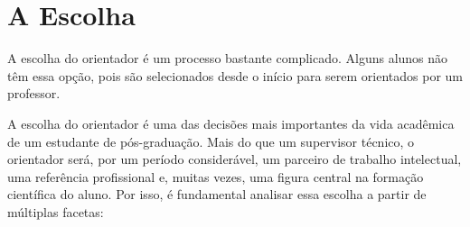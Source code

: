 \section{A Escolha}


A escolha do orientador é um processo bastante complicado. Alguns alunos não têm essa opção, pois são selecionados desde o início para serem orientados por um professor. 



A escolha do orientador é uma das decisões mais importantes da vida acadêmica de um estudante de pós-graduação. Mais do que um supervisor técnico, o orientador será, por um período considerável, um parceiro de trabalho intelectual, uma referência profissional e, muitas vezes, uma figura central na formação científica do aluno. Por isso, é fundamental analisar essa escolha a partir de múltiplas facetas:

